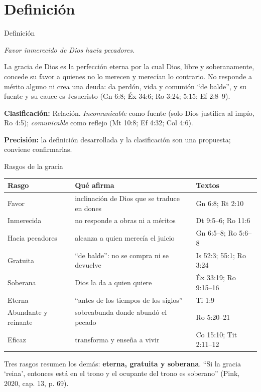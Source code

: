 \documentclass[hyperref={bookmarks=false},aspectratio=169]{beamer}
\newcommand{\destacar}[1]{\textbf{\textcolor{azul}{#1}}}
\newcommand{\precision}[1]{{\footnotesize\color{gris}\textbf{Precisión:} #1}}
\begin{document}
\section{Definición}

\begin{frame}{Definición}
\begin{tcolorbox}[colback=papiro,colframe=dorado,boxrule=1.2pt,arc=3pt]
\centering\itshape Favor inmerecido de Dios hacia pecadores.
\end{tcolorbox}
\begin{tcolorbox}[colback=papiro,colframe=azul,boxrule=1pt,arc=3pt,fonttitle=\bfseries\small,title=Desarrollada,fontupper=\small]
La gracia de Dios es la perfección eterna por la cual Dios, libre y soberanamente, concede su favor a quienes no lo merecen y merecían lo contrario. No responde a mérito alguno ni crea una deuda: da perdón, vida y comunión ``de balde'', y su fuente y su cauce es Jesucristo (Gn 6:8; Éx 34:6; Ro 3:24; 5:15; Ef 2:8--9).
\end{tcolorbox}
\scriptsize\textbf{Clasificación:} Relación. \emph{Incomunicable} como fuente (solo Dios justifica al impío, Ro 4:5); \emph{comunicable} como reflejo (Mt 10:8; Ef 4:32; Col 4:6).\par
\precision{la definición desarrollada y la clasificación son una propuesta; conviene confirmarlas.}
\end{frame}

\begin{frame}{Rasgos de la gracia}
\scriptsize\renewcommand{\arraystretch}{1.15}
\begin{tabular}{@{}>{\RaggedRight\arraybackslash}p{2.6cm}>{\RaggedRight\arraybackslash}p{5.8cm}>{\RaggedRight\arraybackslash}p{3.2cm}@{}}
\toprule
\textbf{Rasgo} & \textbf{Qué afirma} & \textbf{Textos} \\ \midrule
Favor & inclinación de Dios que se traduce en dones & Gn 6:8; Rt 2:10 \\
Inmerecida & no responde a obras ni a méritos & Dt 9:5--6; Ro 11:6 \\
Hacia pecadores & alcanza a quien merecía el juicio & Gn 6:5--8; Ro 5:6--8 \\
Gratuita & ``de balde'': no se compra ni se devuelve & Is 52:3; 55:1; Ro 3:24 \\
Soberana & Dios la da a quien quiere & Éx 33:19; Ro 9:15--16 \\
Eterna & ``antes de los tiempos de los siglos'' & 2 Ti 1:9 \\
Abundante y reinante & sobreabunda donde abundó el pecado & Ro 5:20--21 \\
Eficaz & transforma y enseña a vivir & 1 Co 15:10; Tit 2:11--12 \\
\bottomrule
\end{tabular}\par\medskip
\small Tres rasgos resumen los demás: \destacar{eterna, gratuita y soberana}. ``Si la gracia `reina', entonces está en el trono y el ocupante del trono es soberano'' (Pink, 2020, cap. 13, p. 69).
\end{frame}
\end{document}

